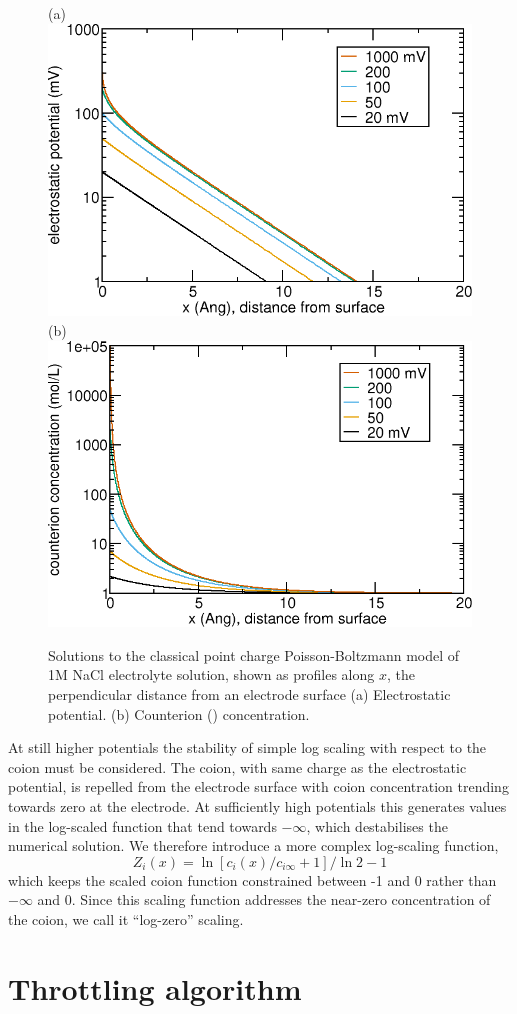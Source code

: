 \begin{figure}
\centering
(a)
\includegraphics[width=0.45\linewidth]{graphics/counterion_potential.png}
(b)
\includegraphics[width=0.45\linewidth]{graphics/counterion_logzero.png}
\caption{\label{fig_classical_PB}Solutions to the classical point
  charge Poisson-Boltzmann model of 1M NaCl electrolyte solution,
  shown as profiles along $x$, the perpendicular distance from an
  electrode surface (a) Electrostatic potential. (b) Counterion
  () concentration. }
\end{figure}

At still higher potentials the stability of simple log scaling with
respect to the coion must be considered. The coion, with same charge
as the electrostatic potential, is repelled from the electrode surface
with coion concentration trending towards zero at the electrode. At
sufficiently high potentials this generates values in the log-scaled
function that tend towards $-\infty$, which destabilises the numerical
solution. We therefore introduce a more complex log-scaling function,
\begin{equation}
Z_i(x) = \ln\left[c_i(x)/c_{i\infty}+1\right]/\ln 2 - 1
\label{log_zero}
\end{equation}
which keeps the scaled coion function constrained between -1 and 0
rather than $-\infty$ and 0. Since this scaling function addresses the
near-zero concentration of the coion, we call it ``log-zero'' scaling.

\section{Throttling algorithm}

